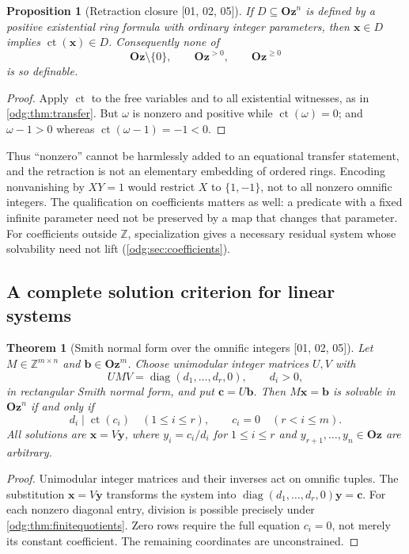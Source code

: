 \documentclass[11pt,oneside]{article}
\numberwithin{equation}{section}
\newtheorem{theorem}{Theorem}[section]
\newtheorem{proposition}[proposition]{Proposition}
\theoremstyle{definition}
\theoremstyle{remark}
\newcommand{\Oz}{\mathbf{Oz}}
\newcommand{\Z}{\mathbb Z}
\newcommand{\ct}{\operatorname{ct}}
\newcommand{\diag}{\operatorname{diag}}
\newcommand{\src}[1]{\textup{\textsf{\small[#1]}}}
\begin{document}
\begin{proposition}[Retraction closure \src{01, 02, 05}]\label{odg:prop:notdiophantine}
If $D\subseteq\Oz^n$ is defined by a positive existential ring formula with
ordinary integer parameters, then $\mathbf x\in D$ implies
$\ct(\mathbf x)\in D$. Consequently none of
\[
 \Oz\setminus\{0\},\qquad \Oz^{>0},\qquad \Oz^{\geq0}
\]
is so definable.
\end{proposition}
\begin{proof}
Apply $\ct$ to the free variables and to all existential witnesses, as in
\cref{odg:thm:transfer}. But $\omega$ is nonzero and positive while
$\ct(\omega)=0$; and $\omega-1>0$ whereas $\ct(\omega-1)=-1<0$.
\end{proof}

Thus ``nonzero'' cannot be harmlessly added to an equational transfer
statement, and the retraction is not an elementary embedding of ordered
rings. Encoding nonvanishing by $XY=1$ would restrict $X$ to $\{1,-1\}$,
not to all nonzero omnific integers. The qualification on coefficients
matters as well: a predicate with a fixed infinite parameter need not be
preserved by a map that changes that parameter. For coefficients outside
$\Z$, specialization gives a necessary residual system whose solvability need
not lift (\cref{odg:sec:coefficients}).

\subsection{A complete solution criterion for linear systems}

\begin{theorem}[Smith normal form over the omnific integers \src{01, 02, 05}]\label{odg:thm:smith}
Let $M\in\Z^{m\times n}$ and $\mathbf b\in\Oz^m$. Choose unimodular
integer matrices $U,V$ with
\[
 UMV=\diag(d_1,\ldots,d_r,0),\qquad d_i>0,
\]
in rectangular Smith normal form, and put $\mathbf c=U\mathbf b$.
Then $M\mathbf x=\mathbf b$ is solvable in $\Oz^n$ if and only if
\begin{equation}\label{odg:eq:smithcriterion}
 d_i\mid\ct(c_i)\quad(1\leq i\leq r),
 \qquad c_i=0\quad(r<i\leq m).
\end{equation}
All solutions are $\mathbf x=V\mathbf y$, where
$y_i=c_i/d_i$ for $1\le i\le r$ and $y_{r+1},\ldots,y_n\in\Oz$ are
arbitrary.
\end{theorem}
\begin{proof}
Unimodular integer matrices and their inverses act on omnific tuples.
The substitution $\mathbf x=V\mathbf y$ transforms the system into
$\diag(d_1,\ldots,d_r,0)\mathbf y=\mathbf c$. For each nonzero diagonal entry,
division is possible precisely under \cref{odg:thm:finitequotients}. Zero rows
require the full equation $c_i=0$, not merely its constant coefficient. The
remaining coordinates are unconstrained.
\end{proof}
\end{document}
